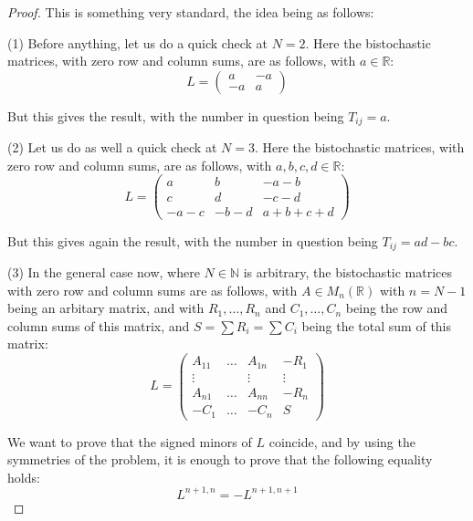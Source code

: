 \documentclass[12pt]{amsbook}
\begin{document}
\begin{proof}
This is something very standard, the idea being as follows:

\medskip

(1) Before anything, let us do a quick check at $N=2$. Here the bistochastic matrices, with zero row and column sums, are as follows, with $a\in\mathbb R$:
$$L=\begin{pmatrix}a&-a\\ -a&a\end{pmatrix}$$

But this gives the result, with the number in question being $T_{ij}=a$.

\medskip

(2) Let us do as well a quick check at $N=3$. Here the bistochastic matrices, with zero row and column sums, are as follows, with $a,b,c,d\in\mathbb R$:
$$L=\begin{pmatrix}
a&b&-a-b\\
c&d&-c-d\\
-a-c&-b-d&a+b+c+d
\end{pmatrix}$$

But this gives again the result, with the number in question being $T_{ij}=ad-bc$.

\medskip

(3) In the general case now, where $N\in\mathbb N$ is arbitrary, the bistochastic matrices with zero row and column sums are as follows, with $A\in M_n(\mathbb R)$ with $n=N-1$ being an arbitary matrix, and with $R_1,\ldots,R_n$ and $C_1,\ldots,C_n$ being the row and column sums of this matrix, and $S=\sum R_i=\sum C_i$ being the total sum of this matrix:
$$L=\begin{pmatrix}
A_{11}&\ldots&A_{1n}&-R_1\\
\vdots&&\vdots&\vdots\\
A_{n1}&\ldots&A_{nn}&-R_n\\
-C_1&\ldots&-C_n&S
\end{pmatrix}$$

We want to prove that the signed minors of $L$ coincide, and by using the symmetries of the problem, it is enough to prove that the following equality holds:
$$L^{n+1,n}=-L^{n+1,n+1}$$


\end{proof}
\end{document}
